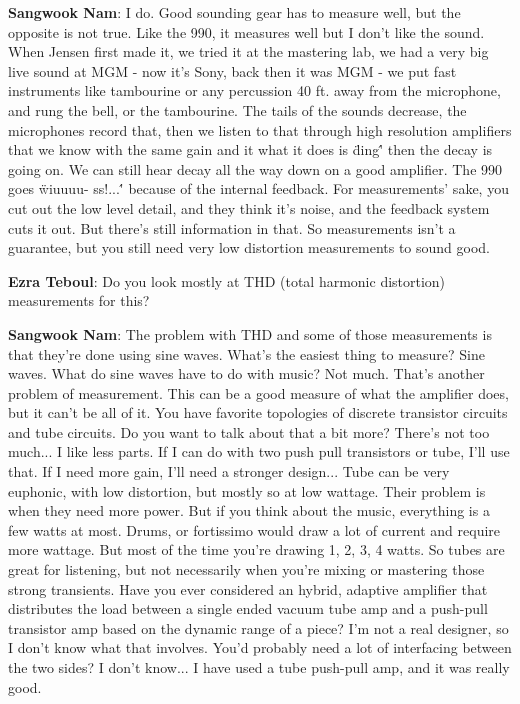 \textbf{Sangwook Nam}: I do. Good sounding gear has to measure well, but the opposite is not true. Like the 990, it measures well but I don't like the sound. When Jensen first made it, we tried it at the mastering lab, we had a very big live sound at MGM - now it's Sony, back then it was MGM - we put fast instruments like tambourine or any percussion 40 ft. away from the microphone, and rung the bell, or the tambourine. The tails of the sounds decrease, the microphones record that, then we listen to that through high resolution amplifiers that we know with the same gain and it what it does is \"ding\'' then the decay is going on. We can still hear decay all the way down on a good amplifier. The 990 goes \"wiuuuu- ss!...\'' because of the internal feedback. For measurements' sake, you cut out the low level detail, and they think it's noise, and the feedback system cuts it out. But there's still information in that. So measurements isn't a guarantee, but you still need very low distortion measurements to sound good.

\textbf{Ezra Teboul}: Do you look mostly at THD (total harmonic distortion) measurements for this?

\textbf{Sangwook Nam}: The problem with THD and some of those measurements is that they're done using sine waves. What's the easiest thing to measure? Sine waves. What do sine waves have to do with music? Not much. That's another problem of measurement. This can be a good measure of what the amplifier does, but it can't be all of it.
You have favorite topologies of discrete transistor circuits and tube circuits. Do you want to talk about that a bit more?
There's not too much... I like less parts. If I can do with two push pull transistors or tube, I'll use that. If I need more gain, I'll need a stronger design... Tube can be very euphonic, with low distortion, but mostly so at low wattage. Their problem is when they need more power. But if you think about the music, everything is a few watts at most. Drums, or fortissimo would draw a lot of current and require more wattage. But most of the time you're drawing 1, 2, 3, 4 watts. So tubes are great for listening, but not necessarily when you're mixing or mastering those strong transients.
Have you ever considered an hybrid, adaptive amplifier that distributes the load between a single ended vacuum tube amp and a push-pull transistor amp based on the dynamic range of a piece?
I'm not a real designer, so I don't know what that involves. You'd probably need a lot of interfacing between the two sides? I don't know... I have used a tube push-pull amp, and it was really good.

